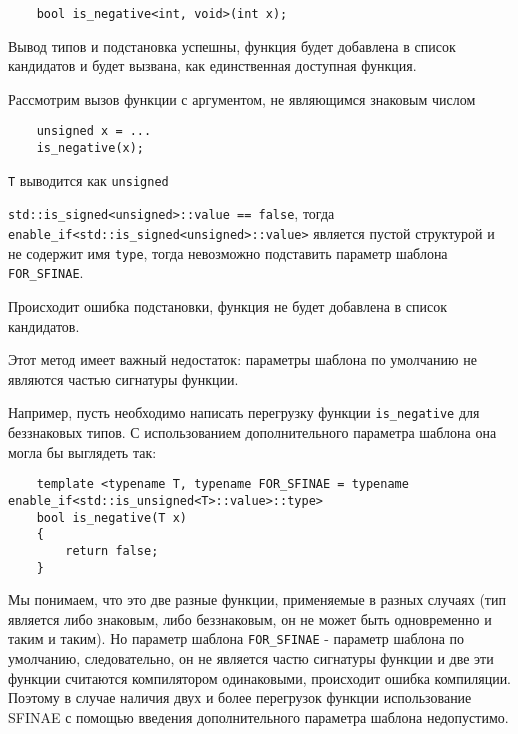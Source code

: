 	\begin{verbatim}
	bool is_negative<int, void>(int x);
	\end{verbatim}
	
	Вывод типов и подстановка успешны, функция будет добавлена в список кандидатов и будет вызвана, как единственная доступная функция.
	
	Рассмотрим вызов функции с аргументом, не являющимся знаковым числом
	
	\begin{verbatim}
	unsigned x = ...
	is_negative(x);
	\end{verbatim}
	
	\texttt{T} выводится как \texttt{unsigned}
	
	\texttt{std::is_signed<unsigned>::value == false}, тогда \texttt{enable_if<std::is_signed<unsigned>::value>} является пустой структурой и не содержит имя \texttt{type}, тогда невозможно подставить параметр шаблона \texttt{FOR_SFINAE}.
	
	Происходит ошибка подстановки, функция не будет добавлена в список кандидатов.
	
	\vspace{\baselineskip}
	
	Этот метод имеет важный недостаток: параметры шаблона по умолчанию не являются частью сигнатуры функции. 
	
	Например, пусть необходимо написать перегрузку функции \texttt{is_negative} для беззнаковых типов. С использованием дополнительного параметра шаблона она могла бы выглядеть так:
	
	\begin{verbatim}
	template <typename T, typename FOR_SFINAE = typename enable_if<std::is_unsigned<T>::value>::type>
	bool is_negative(T x)
	{
		return false;
	}
	\end{verbatim}
	
	Мы понимаем, что это две разные функции, применяемые в разных случаях (тип является либо знаковым, либо беззнаковым, он не может быть одновременно и таким и таким). Но параметр шаблона \texttt{FOR_SFINAE}  - параметр шаблона по умолчанию, следовательно, он не является частю сигнатуры функции и две эти функции считаются компилятором одинаковыми, происходит ошибка компиляции. Поэтому в случае наличия двух и более перегрузок функции использование SFINAE с помощью введения дополнительного параметра шаблона недопустимо.
	
